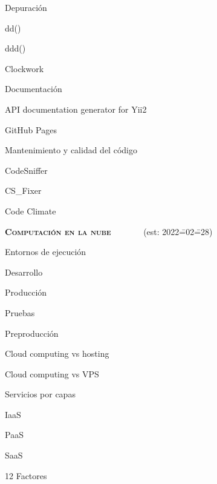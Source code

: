 \begin{longenum}
\begin{longenum}
\begin{longenum}
        \end{longenum}
        \item Depuración
        \begin{longenum}
            \item dd()
            \item ddd()
            \item Clockwork
        \end{longenum}
        \item Documentación
        \begin{longenum}
            \item API documentation generator for Yii2
            \item GitHub Pages
        \end{longenum}
        \item Mantenimiento y calidad del código
        \begin{longenum}
            \item CodeSniffer
            \item CS\_Fixer
            \item Code Climate
        \end{longenum}
    \end{longenum}
    \item \textbf{\textsc{Computación en la nube}} \ \ \ \ \ \ \ (est: 2022\==02\==28)
    \begin{longenum}
        \item Entornos de ejecución
        \begin{longenum}
            \item Desarrollo
            \item Producción
            \item Pruebas
            \item Preproducción
        \end{longenum}
        \item Cloud computing vs hosting
        \item Cloud computing vs VPS
        \item Servicios por capas
        \begin{longenum}
            \item IaaS
            \item PaaS
            \item SaaS
        \end{longenum}
        \item 12 Factores

\end{longenum}
\end{longenum}
